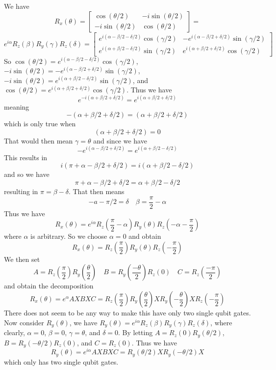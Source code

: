 We have 
\[R_{x}(\theta) = \begin{bmatrix}
    \cos(\theta/2) & -i\sin(\theta/2)\\
    -i\sin(\theta/2) & \cos(\theta/2)
\end{bmatrix} =\] \[
e^{i\alpha}R_z(\beta)R_y(\gamma)R_z(\delta) =
\begin{bmatrix}
    e^{i(\alpha- \beta/2 - \delta/2)}\cos(\gamma/2)  & -e^{i(\alpha- \beta/2 + \delta/2)}\sin(\gamma/2) \\
    e^{i(\alpha + \beta/2 - \delta/2)}\sin(\gamma/2) & e^{i(\alpha+ \beta/2 + \delta/2)}\cos(\gamma/2) 
\end{bmatrix} \]
So $\cos(\theta/2) =e^{i(\alpha- \beta/2 - \delta/2)}\cos(\gamma/2)$, $-i\sin(\theta/2) = -e^{i(\alpha- \beta/2 + \delta/2)}\sin(\gamma/2)$, $-i\sin(\theta/2) = e^{i(\alpha + \beta/2 - \delta/2)}\sin(\gamma/2)$, and $\cos(\theta/2) = e^{i(\alpha+ \beta/2 + \delta/2)}\cos(\gamma/2)$. Thus we have \[e^{-i(\alpha+ \beta/2 + \delta/2)}=e^{i(\alpha+ \beta/2 + \delta/2)}\] meaning \[-(\alpha+ \beta/2 + \delta/2) = (\alpha+ \beta/2 + \delta/2)\] which is only true when 
\[(\alpha+ \beta/2 + \delta/2) = 0\]
That would then mean $\gamma = \theta$
and since we have \[-e^{i(\alpha- \beta/2 + \delta/2)} = e^{i(\alpha + \beta/2 - \delta/2)}\] This results in
\[i(\pi + \alpha- \beta/2 + \delta/2)= i(\alpha + \beta/2 - \delta/2)\] and so we have 
\[\pi + \alpha- \beta/2 + \delta/2 =\alpha + \beta/2 - \delta/2 \] resulting in $ \pi = \beta- \delta $.
That then means \[-a - \pi/2 =\delta\quad \beta = \frac{\pi}{2} -\alpha\] Thus we have 
\[R_x(\theta) = e^{i\alpha}R_z\left(\frac{\pi}{2} - \alpha\right)R_y(\theta)R_z\left(-\alpha -\frac{\pi}{2}\right)\]
where $\alpha$ is arbitrary. So we choose $\alpha = 0$ and obtain 
\[R_x(\theta) = R_z\left(\frac{\pi}{2}\right)R_y(\theta)R_z\left(-\frac{\pi}{2}\right)\]We then set \[A = R_z\left(\frac{\pi}{2} \right)R_y\left(\frac{\theta}{2}\right)\quad B = R_y\left(\frac{-\theta}{2}\right)R_z\left(0\right)\quad C = R_z\left(\frac{-\pi}{2}\right)\]
and obtain the decomposition \[R_x(\theta) = e^{\alpha}AXBXC =R_z\left(\frac{\pi}{2} \right)R_y\left(\frac{\theta}{2}\right)XR_y\left(-\frac{\theta}{2}\right)XR_z\left(-\frac{\pi}{2}\right)\] There does not seem to be any way to make this have only two single qubit gates. Now consider $R_y(\theta)$, we have $ R_y(\theta) = e^{i\alpha}R_z(\beta)R_y(\gamma)R_z(\delta)$, where clearly, $\alpha = 0$, $\beta = 0$, $\gamma = \theta$, and $\delta = 0$. By letting $ A = R_z(0)R_y(\theta/2) $, $B = R_y(-\theta/2)R_z(0)$, and $C = R_z(0)$. Thus we have 
\[R_y(\theta) = e^{i\alpha}AXBXC = R_y(\theta/2) X R_y(-\theta/2) X\] which only has two single qubit gates.

